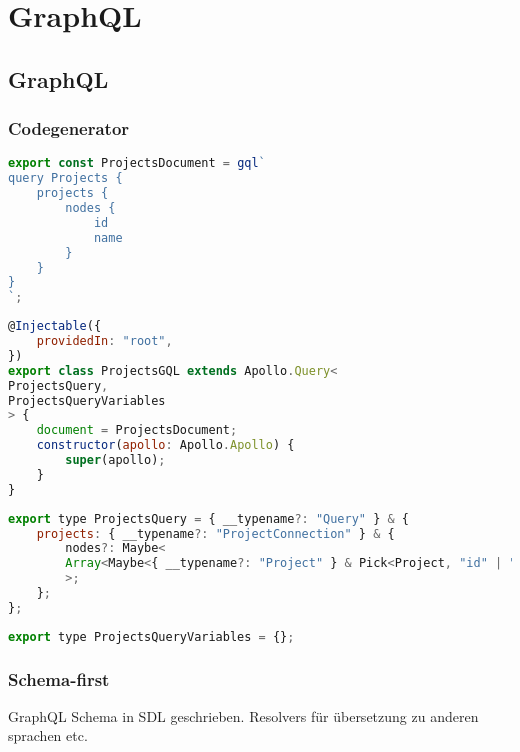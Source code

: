 

\chapter{GraphQL}

\section{GraphQL}
\subsection{Codegenerator}
\begin{lstlisting}[language=JavaScript,float=h!,caption={Generierter Aufruf der gql-Funktion erhält Querystring als Parameter}, label={lst:example:service}]
export const ProjectsDocument = gql`
query Projects {
    projects {
        nodes {
            id
            name
        }
    }
}
`;
\end{lstlisting}

\begin{lstlisting}[language=JavaScript,float=h!,caption={Generierter Service enthält den Aufruf der Query als Instanzvariable}, label={lst:example:service}]
@Injectable({
    providedIn: "root",
})
export class ProjectsGQL extends Apollo.Query<
ProjectsQuery,
ProjectsQueryVariables
> {
    document = ProjectsDocument;
    constructor(apollo: Apollo.Apollo) {
        super(apollo);
    }
}
\end{lstlisting}

\begin{lstlisting}[language=JavaScript,float=h!,caption={Generierter Antworttyp}, label={lst:example:service}]
export type ProjectsQuery = { __typename?: "Query" } & {
    projects: { __typename?: "ProjectConnection" } & {
        nodes?: Maybe<
        Array<Maybe<{ __typename?: "Project" } & Pick<Project, "id" | "name">>>
        >;
    };
};
\end{lstlisting}

\begin{lstlisting}[language=JavaScript,float=h!,caption={Generierter Parametertyp}, label={lst:example:service}]
export type ProjectsQueryVariables = {};
\end{lstlisting}




\subsection{Schema-first}
GraphQL Schema in SDL geschrieben. Resolvers für übersetzung zu anderen sprachen etc.
